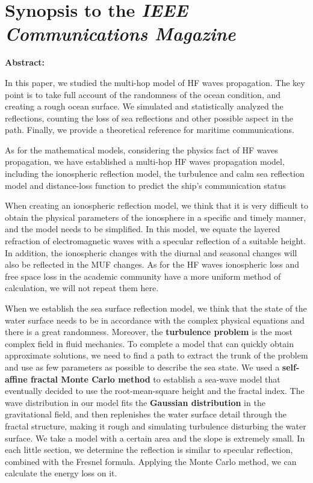 \documentclass{mcmthesis}
\begin{document}
\newpage
\section{Synopsis to the \emph{IEEE Communications Magazine}}

\textbf{Abstract:}

  In this paper, we studied the multi-hop model of HF waves propagation. The key point is to take full account of the randomness of the ocean condition, and creating a rough ocean surface. We simulated and statistically analyzed the reflections, counting the loss of sea reflections and other possible aspect in the path. Finally, we provide a theoretical reference for maritime communications.

  As for the mathematical models, considering the physics fact of HF waves propagation, we have established a multi-hop HF waves propagation model, including the ionospheric reflection model, the turbulence and calm sea reflection model and distance-loss function to predict the ship's communication status

  When creating an ionospheric reflection model, we think that it is very difficult to obtain the physical parameters of the ionosphere in a specific and timely manner, and the model needs to be simplified. In this model, we equate the layered refraction of electromagnetic waves with a specular reflection of a suitable height. In addition, the ionospheric changes with the diurnal and seasonal changes will also be reflected in the MUF changes. As for the HF waves ionospheric loss and free space loss in the academic community have a more uniform method of calculation, we will not repeat them here.

  When we establish the sea surface reflection model, we think that the state of the water surface needs to be in accordance with the complex physical equations and there is a great randomness. Moreover, the \textbf{turbulence problem} is the most complex field in fluid mechanics. To complete a model that can quickly obtain approximate solutions, we need to find a path to extract the trunk of the problem and use as few parameters as possible to describe the sea state. We used a \textbf{self-affine fractal Monte Carlo method} to establish a sea-wave model that eventually decided to use the root-mean-square height and the fractal index. The wave distribution in our model fits the \textbf{Gaussian distribution} in the gravitational field, and then replenishes the water surface detail through the fractal structure, making it rough and simulating turbulence disturbing the water surface. We take a model with a certain area and the slope is extremely small. In each little section, we determine the reflection is similar to specular reflection, combined with the Fresnel formula. Applying the Monte Carlo method, we can calculate the energy loss on it.
\end{document}
